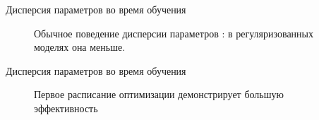 \documentclass[9pt,pdf,hyperref={unicode}]{beamer}
\begin{document}
\begin{frame}{Дисперсия параметров во время обучения}
\begin{figure}[h!]
\caption{Обычное поведение дисперсии параметров : в регуляризованных моделях она меньше.}
\label{fig:opt schedule 2}
\end{figure}
\end{frame}
\begin{frame}{Дисперсия параметров во время обучения}
\begin{figure}[h!]
\caption{Первое расписание оптимизации демонстрирует большую эффективность}
\label{fig:opt schedule 2}
\end{figure}
\end{frame}
\end{document}
